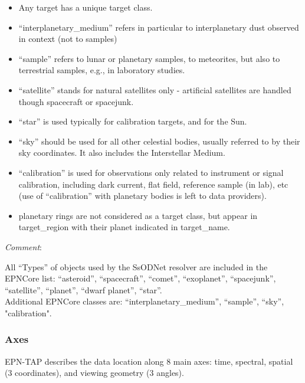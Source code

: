 \documentclass[11pt,a4paper]{ivoa}
\begin{document}
\begin{itemize}

\item Any target has a unique target class.

\item ``interplanetary\_medium'' refers in particular to interplanetary dust observed in context (not to samples)

\item ``sample'' refers to lunar or planetary samples, to meteorites, but also to terrestrial samples, e.g., in laboratory studies.

\item ``satellite'' stands for natural satellites only - artificial satellites are handled though spacecraft or spacejunk.

\item ``star'' is used typically for calibration targets, and for the Sun.

\item ``sky'' should be used for all other celestial bodies, usually referred to by their sky coordinates. It also includes the Interstellar Medium.

\item ``calibration'' is used for observations only related to instrument or signal calibration, including dark current, flat field, reference sample (in lab), etc (use of ``calibration'' with planetary bodies is left to data providers).

\item planetary rings are not considered as a target class, but appear in target\_region with their planet indicated in target\_name.

\end{itemize}

\emph{Comment}: 

All ``Types'' of objects used by the SsODNet resolver are included in the EPNCore list: ``asteroid'', ``spacecraft'', ``comet'', ``exoplanet'', ``spacejunk'', ``satellite'', ``planet'', ``dwarf planet'', ``star''.\\Additional EPNCore classes are: ``interplanetary\_medium'', ``sample'', ``sky'', "calibration".


\subsubsection{Axes}

EPN-TAP describes the data location along 8 main axes: time, spectral, spatial (3 coordinates), and viewing geometry (3 angles). 
\end{document}
